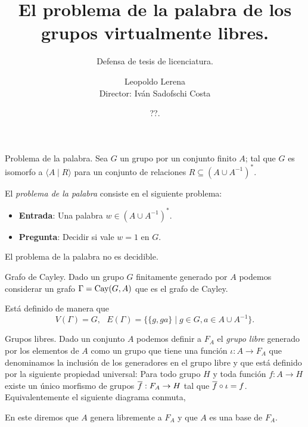 \documentclass[aspectratio=169, 11pt]{beamer}
\title{El problema de la palabra de los grupos virtualmente libres.}
\subtitle{Defensa de tesis de licenciatura.}
\date{??.}
\author{Leopoldo Lerena \\
		Director: Iván Sadofschi Costa				
		}
\institute{Universidad de Buenos Aires}
\begin{document}
	\maketitle

	
	
	
	\begin{frame}[fragile]{Problema de la palabra.}
		Sea $G$ un grupo \fg por un conjunto finito $A$; 
		tal que $G$ es isomorfo a $\langle A \mid R \rangle$ para un conjunto de relaciones $R \subseteq (A \cup A^{-1})^*$.
		
		El \emph{problema de la palabra} consiste en el siguiente problema:
		\begin{itemize}
			\item 
				\textbf{Entrada}: Una palabra $w \in (A \cup A^{-1})^*$.
			
			\item 
				\textbf{Pregunta}: Decidir si vale $w=1$ en $G$.
		\end{itemize}
		
		\alert{El problema de la palabra no es decidible.}
	\end{frame}

	\begin{frame}[fragile]{Grafo de Cayley.}
		Dado un grupo $G$ finitamente generado por $A$ podemos considerar un grafo $\Gamma =\textrm{Cay}(G, A)$ que es el grafo de Cayley.

		Está definido de manera que 
		\[
			V(\Gamma) = G,   \ \ \ E(\Gamma) = \{ \{ g,ga \}  \mid g \in G, a \in A \cup A^{-1}  \}. 	
		\]
	\end{frame}
	
	\begin{frame}[fragile]{Grupos libres.}
		Dado un conjunto $A$ podemos definir a $F_{A}$ el \emph{grupo libre} generado por los elementos de $A$ como un grupo que tiene una función  $\iota: A \to F_{A}$ que denominamos la inclusión de los generadores en el grupo libre y que está definido por la siguiente propiedad universal: 
	Para todo grupo $H$ y toda función $f:A \to H$ existe un único morfismo de grupos $\overline f: F_{A} \to H$ tal que $\overline f \circ \iota = f$.
	Equivalentemente el siguiente diagrama conmuta,
	\begin{center}
	\end{center}
	En este diremos que $A$ genera libremente a $F_{A}$ y que $A$ es una base de $F_{A}$.
	\end{frame}
\end{document}
